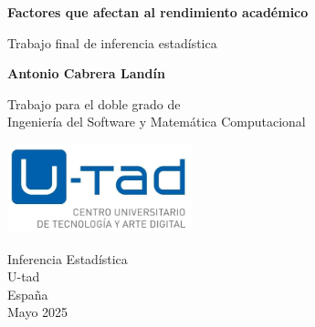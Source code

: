 \documentclass[12pt]{report}
\begin{document}
\begin{titlepage}
    \begin{center}
        \vspace*{1cm}
 
        \Large\textbf{Factores que afectan al rendimiento académico}
 
        \vspace{0.5cm}
            Trabajo final de inferencia estadística
        \vspace{1.5cm}
 
        \textbf{Antonio Cabrera Landín}
 
        \vfill
             
        Trabajo para el doble grado de\\
        Ingeniería del Software y Matemática Computacional\\
             
        \vspace{0.8cm}
      
        \includegraphics[width=0.4\textwidth]{figures/logo-u-tad.png}
             
        Inferencia Estadística\\
        U-tad\\
        España\\
        Mayo 2025
             
    \end{center}
 \end{titlepage}



\tableofcontents

\listoffigures












\end{document}
